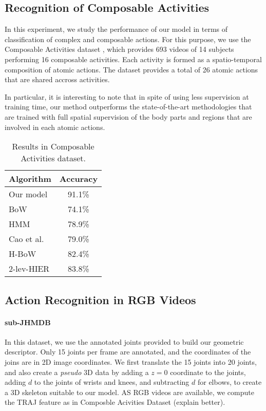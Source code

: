 \subsection{Recognition of Composable Activities}
In this experiment, we study the performance of our model in terms of
classification of complex and composable actions.
For this purpose, we use the Composable Activities dataset \cite{Lillo2014},
which provides 693 videos of 14 subjects performing 16 composable activities.
Each activity is formed as a spatio-temporal composition of atomic actions.
The dataset provides a total of 26 atomic actions that are shared accross
activities.

In particular, it is interesting to note that in spite of using less
supervision at training time, our method outperforms the state-of-the-art
methodologies that are trained with full spatial supervision of the body parts
and regions that are involved in each atomic actions.


\begin{table}
\centering
\begin{tabular}{|l|c|}
\hline
\textbf{Algorithm} & \textbf{Accuracy}\\
\hline
Our model &  91.1\% \\
\hline
BoW & 74.1\%    \\
HMM & 78.9\%  \\
Cao et al. \cite{cao2015spatio} & 79.0\% \\
H-BoW & 82.4\%   \\
2-lev-HIER & 83.8\%  \\
\hline
\end{tabular}
\caption{Results in Composable Activities dataset. }
\end{table}
 
\subsection{Action Recognition in RGB Videos}

 \paragraph{sub-JHMDB} In this dataset, we use the annotated joints provided to build our geometric descriptor. Only 15 joints per frame are annotated, and the coordinates of the joins are in 2D image coordinates. We first translate the 15 joints into 20 joints, and also create a \emph{pseudo} 3D data by adding a $z=0$ coordinate to the joints, adding $d$ to the joints of wrists and knees, and subtracting $d$ for elbows, to create a 3D skeleton suitable to our model. AS RGB videos are available, we compute the TRAJ feature as in Composble Acivities Dataset (explain better).

